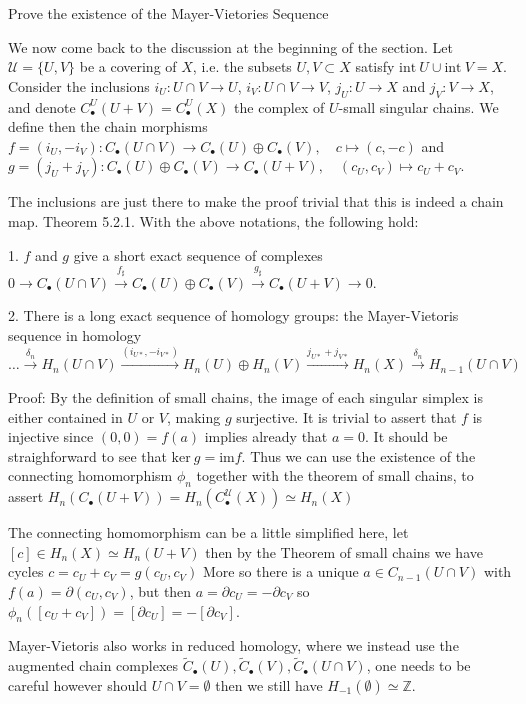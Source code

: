 Prove the existence of the Mayer-Vietories Sequence

We now come back to the discussion at the beginning of the section. Let \(\mathcal{U} = \{U, V\}\) be a covering of \(X\), i.e. the subsets \(U, V \subset X\) satisfy 
\(\text{int}\ U \cup \text{int}\ V = X\). Consider the inclusions \(i_U : U \cap V \to U\), \(i_V : U \cap V \to V\), \(j_U : U \to X\) and \(j_V : V \to X\), 
and denote \(C^{U}_\bullet(U + V) = C^{U}_\bullet(X)\) the complex of \(U\)-small singular chains. We define then the chain morphisms
\(f = (i_U, -i_V) : C_\bullet(U \cap V) \to C_\bullet(U) \oplus C_\bullet(V), \quad c \mapsto (c, -c)\)
and
\(g = (j_U + j_V) : C_\bullet(U) \oplus C_\bullet(V) \to C_\bullet(U + V), \quad (c_U, c_V) \mapsto c_U + c_V.\)

The inclusions are just there to make the proof trivial that this is indeed a chain map.
Theorem 5.2.1. With the above notations, the following hold:

1. \(f\) and \(g\) give a short exact sequence of complexes
\(0 \to C_\bullet(U \cap V) \xrightarrow{f_\sharp} C_\bullet(U) \oplus C_\bullet(V) \xrightarrow{g_\sharp} C_\bullet(U + V) \to 0.\)

2. There is a long exact sequence of homology groups: the Mayer-Vietoris sequence in homology
\(\dots \xrightarrow{\delta_n} H_n(U \cap V) \xrightarrow{(i_{U*}, -i_{V*})} H_n(U) \oplus H_n(V) \xrightarrow{j_{U*} + j_{V*}} H_n(X) \xrightarrow{\delta_n} H_{n-1}(U \cap V)\)

Proof:
By the definition of small chains, the image of each singular simplex is either contained in \( U \) or \( V \), making \( g \) surjective.
It is trivial to assert that \( f \) is injective since \( (0, 0) = f(a) \) implies already that \( a = 0 \).
It should be straighforward to see that \( \text{ker}\ g = \text{im} f \).
Thus we can use the existence of the connecting homomorphism \( \phi_n \) together with the theorem of small chains, to assert
\( H_n(C_{\bullet}(U + V)) = H_n(C^{\mathcal{U}}_{\bullet}(X)) \simeq H_n(X) \)


The connecting homomorphism can be a little simplified here,
let \( [c] \in H_n(X) \simeq H_n(U + V) \) then by the Theorem of small chains we have cycles \( c = c_{U} + c_{V} = g(c_{U}, c_{V}) \)
More so there is a unique \( a \in C_{n-1}(U \cap V) \) with \( f(a) = \partial(c_U, c_V) \), but then \( a = \partial c_U = -\partial c_V  \)
so \( \phi_n([c_U + c_V]) = [\partial c_U] = - [\partial c_V] \).

Mayer-Vietoris also works in reduced homology, where we instead use the augmented chain complexes 
\( \tilde{C}_\bullet(U), \tilde{C}_\bullet(V), \tilde{C}_\bullet(U \cap V) \),
one needs to be careful however should \( U \cap V = \emptyset \) then we still have \( H_{-1}(\emptyset) \simeq \mathbb{Z} \).


